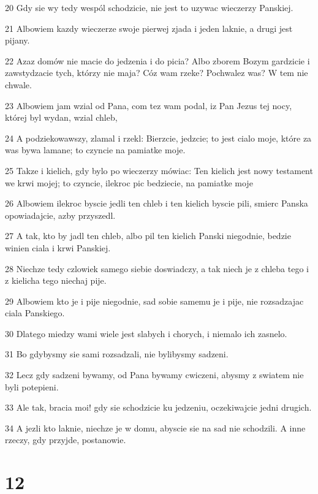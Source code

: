 \par 20 Gdy sie wy tedy wespól schodzicie, nie jest to uzywac wieczerzy Panskiej.
\par 21 Albowiem kazdy wieczerze swoje pierwej zjada i jeden laknie, a drugi jest pijany.
\par 22 Azaz domów nie macie do jedzenia i do picia? Albo zborem Bozym gardzicie i zawstydzacie tych, którzy nie maja? Cóz wam rzeke? Pochwalez was? W tem nie chwale.
\par 23 Albowiem jam wzial od Pana, com tez wam podal, iz Pan Jezus tej nocy, której byl wydan, wzial chleb,
\par 24 A podziekowawszy, zlamal i rzekl: Bierzcie, jedzcie; to jest cialo moje, które za was bywa lamane; to czyncie na pamiatke moje.
\par 25 Takze i kielich, gdy bylo po wieczerzy mówiac: Ten kielich jest nowy testament we krwi mojej; to czyncie, ilekroc pic bedziecie, na pamiatke moje
\par 26 Albowiem ilekroc byscie jedli ten chleb i ten kielich byscie pili, smierc Panska opowiadajcie, azby przyszedl.
\par 27 A tak, kto by jadl ten chleb, albo pil ten kielich Panski niegodnie, bedzie winien ciala i krwi Panskiej.
\par 28 Niechze tedy czlowiek samego siebie doswiadczy, a tak niech je z chleba tego i z kielicha tego niechaj pije.
\par 29 Albowiem kto je i pije niegodnie, sad sobie samemu je i pije, nie rozsadzajac ciala Panskiego.
\par 30 Dlatego miedzy wami wiele jest slabych i chorych, i niemalo ich zasnelo.
\par 31 Bo gdybysmy sie sami rozsadzali, nie bylibysmy sadzeni.
\par 32 Lecz gdy sadzeni bywamy, od Pana bywamy cwiczeni, abysmy z swiatem nie byli potepieni.
\par 33 Ale tak, bracia moi! gdy sie schodzicie ku jedzeniu, oczekiwajcie jedni drugich.
\par 34 A jezli kto laknie, niechze je w domu, abyscie sie na sad nie schodzili. A inne rzeczy, gdy przyjde, postanowie.

\chapter{12}

